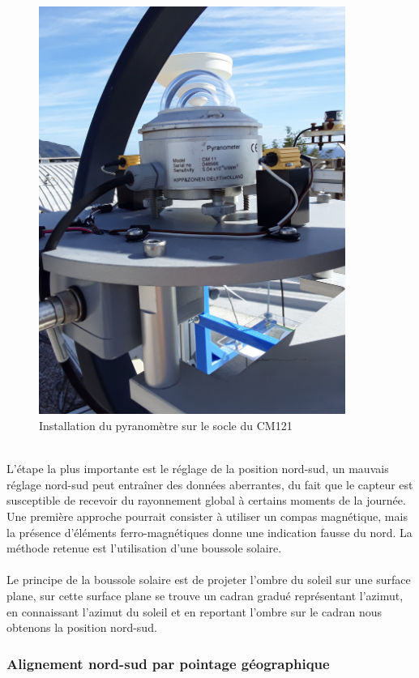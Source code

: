 \documentclass[12pt,a4paper]{article}
\begin{document}
\begin{flushleft}
\begin{figure}[H]
\centering
\includegraphics[width=10cm, angle=-90]{image/montage/4.jpg} 
\caption{Installation du pyranomètre sur le socle du CM121}
\end{figure}
~\\
L'étape la plus importante est le réglage de la position nord-sud, un mauvais réglage nord-sud peut entraîner des données aberrantes, du fait que le capteur est susceptible de recevoir du rayonnement global à certains moments de la journée. Une première approche pourrait consister à utiliser un compas magnétique, mais la présence d'éléments ferro-magnétiques donne une indication fausse du nord. La méthode retenue est l'utilisation d'une boussole solaire.\\
~~\\
Le principe de la boussole solaire est de projeter l'ombre du soleil sur une surface plane, sur cette surface plane se trouve un cadran gradué représentant l'azimut, en connaissant l'azimut du soleil et en reportant l'ombre sur le cadran nous obtenons la position nord-sud.\\

\subsubsection{Alignement nord-sud par pointage géographique}


\end{flushleft}
\end{document}
